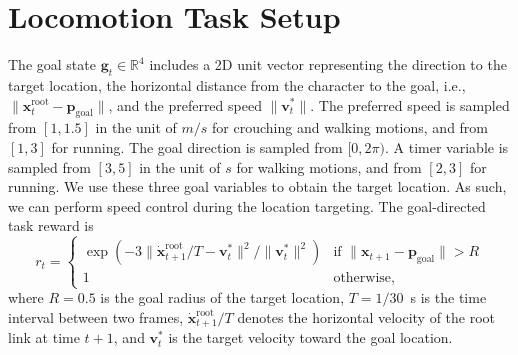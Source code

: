 






\appendix


\vspace*{6pt}
\section{Locomotion Task Setup}
The goal state $\mathbf{g}_t \in \mathbb{R}^4$ includes a 2D unit vector representing the direction to the target location, the horizontal distance from the character to the goal, i.e., $\|\mathbf{x}_t^\text{root} - \mathbf{p}_\text{goal}\|$, and the preferred speed $\| \mathbf{v}_t^\ast \|$.
The preferred speed is sampled from $[1, 1.5]$ in the unit of $m/s$ for crouching and walking motions, and from $[1, 3]$ for running.
The goal direction is sampled from $[0, 2\pi)$.
A timer variable is sampled from $[3, 5]$ in the unit of $s$ for walking motions, and from $[2, 3]$ for running.
We use these three goal variables to obtain the target location.
As such, we can perform speed control during the location targeting.
The goal-directed task reward is
\begin{equation*} %
    r_t = \begin{cases}
        \exp(-3\|\dot{\mathbf{x}}_{t+1}^\text{root}/T - \mathbf{v}_t^\ast\|^2/\| \mathbf{v}_t^\ast \|^2) & \text{if } \|\mathbf{x}_{t+1} - \mathbf{p}_\text{goal}\| > R\\
        1 & \text{otherwise},
    \end{cases}
\end{equation*}
where $R=0.5$ is the goal radius of the target location, $T = 1/30$~s is the time interval between two frames,
$\dot{\mathbf{x}}_{t+1}^\text{root}/T$ denotes the horizontal velocity of the root link at time $t+1$, 
and $\mathbf{v}_t^\ast$ is the target velocity toward the goal location.

